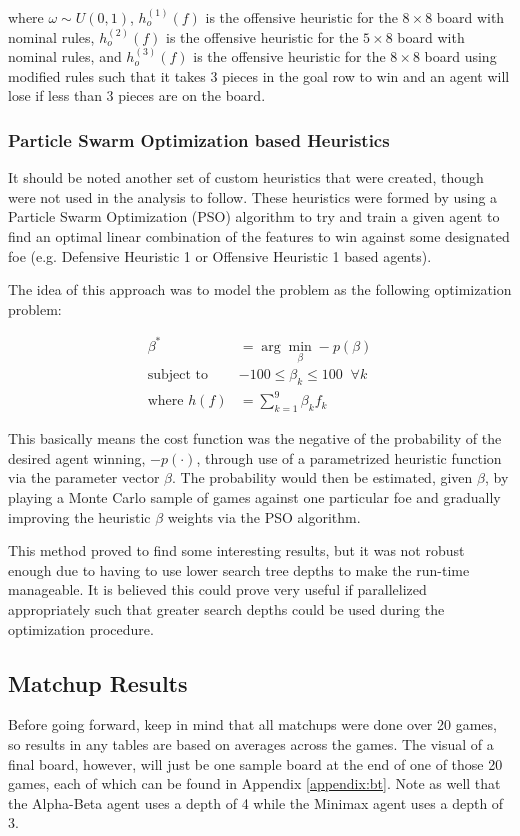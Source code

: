 \documentclass{article}[12pt]
\begin{document}
   where $\omega \sim U(0,1)$, $h_{o}^{(1)}( f )$ is the offensive heuristic for the $8 \times 8$ board with nominal rules, $h_{o}^{(2)}( f )$ is the offensive heuristic for the $5 \times 8$ board with nominal rules, and $h_{o}^{(3)}( f )$ is the offensive heuristic for the $8 \times 8$ board using modified rules such that it takes 3 pieces in the goal row to win and an agent will lose if less than 3 pieces are on the board.
   
   \subsubsection{Particle Swarm Optimization based Heuristics}
   It should be noted another set of custom heuristics that were created, though were not used in the analysis to follow. These heuristics were formed by using a Particle Swarm Optimization (PSO) algorithm to try and train a given agent to find an optimal linear combination of the features to win against some designated foe (e.g. Defensive Heuristic 1 or Offensive Heuristic 1 based agents).
   
   The idea of this approach was to model the problem as the following optimization problem:
   
   \begin{align*}
   \beta^* &= \arg \min_\beta -p(\beta) \\
   \text{subject to }& -100 \leq \beta_k \leq 100 \;\; \forall k \\
   \text{where } h(f) &= \sum_{k=1}^9 \beta_k f_k
   \end{align*}
   
   This basically means the cost function was the negative of the probability of the desired agent winning, $-p(\cdot)$, through use of a parametrized heuristic function via the parameter vector $\beta$. The probability would then be estimated, given $\beta$, by playing a Monte Carlo sample of games against one particular foe and gradually improving the heuristic $\beta$ weights via the PSO algorithm. 
   
   This method proved to find some interesting results, but it was not robust enough due to having to use lower search tree depths to make the run-time manageable. It is believed this could prove very useful if parallelized appropriately such that greater search depths could be used during the optimization procedure.
   
   \subsection{Matchup Results}
    Before going forward, keep in mind that all matchups were done over 20 games, so results in any tables are based on averages across the games. The visual of a final board, however, will just be one sample board at the end of one of those 20 games, each of which can be found in Appendix \ref{appendix:bt}. Note as well that the Alpha-Beta agent uses a depth of 4 while the Minimax agent uses a depth of 3.
    
\end{document}
